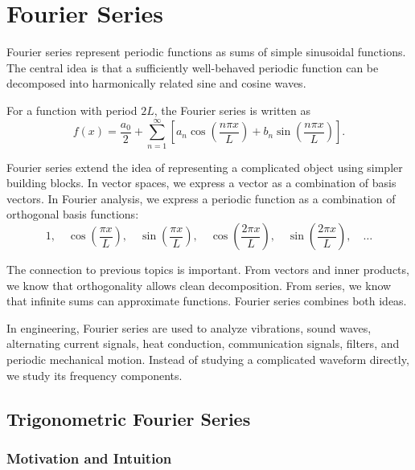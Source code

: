 \section{Fourier Series}

\begin{conceptbox}
    Fourier series represent periodic functions as sums of simple sinusoidal functions. The central idea is that a sufficiently well-behaved periodic function can be decomposed into harmonically related sine and cosine waves.

    For a function with period $2L$, the Fourier series is written as
    \[
        f(x)=\frac{a_0}{2}+\sum_{n=1}^{\infty}
        \left[
            a_n\cos\left(\frac{n\pi x}{L}\right)
            +b_n\sin\left(\frac{n\pi x}{L}\right)
            \right].
    \]
\end{conceptbox}

Fourier series extend the idea of representing a complicated object using simpler building blocks. In vector spaces, we express a vector as a combination of basis vectors. In Fourier analysis, we express a periodic function as a combination of orthogonal basis functions:
\[
    1,\quad \cos\left(\frac{\pi x}{L}\right),\quad \sin\left(\frac{\pi x}{L}\right),\quad
    \cos\left(\frac{2\pi x}{L}\right),\quad \sin\left(\frac{2\pi x}{L}\right),\quad \ldots
\]

The connection to previous topics is important. From vectors and inner products, we know that orthogonality allows clean decomposition. From series, we know that infinite sums can approximate functions. Fourier series combines both ideas.

\begin{noteBox}
    In engineering, Fourier series are used to analyze vibrations, sound waves, alternating current signals, heat conduction, communication signals, filters, and periodic mechanical motion. Instead of studying a complicated waveform directly, we study its frequency components.
\end{noteBox}

\subsection{Trigonometric Fourier Series}

\subsubsection*{Motivation and Intuition}

